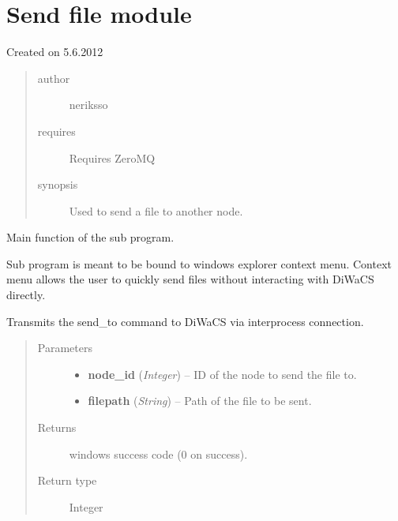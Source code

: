 \documentclass[letterpaper,10pt,english]{sphinxmanual}
\begin{document}
\section{Send file module}
\label{send_file:module-send_file_to}\label{send_file::doc}\label{send_file:send-file-module}
Created on 5.6.2012
\begin{quote}\begin{description}
\item[{author}] \leavevmode
neriksso

\item[{requires}] \leavevmode
Requires ZeroMQ

\item[{synopsis}] \leavevmode
Used to send a file to another node.

\end{description}\end{quote}

\begin{fulllineitems}
\label{send_file:send_file_to.main}
Main function of the sub program.

Sub program is meant to be bound to windows explorer context menu.
Context menu allows the user to quickly send files without interacting
with DiWaCS directly.

Transmits the send\_to command to DiWaCS via interprocess connection.
\begin{quote}\begin{description}
\item[{Parameters}] \leavevmode\begin{itemize}
\item {} 
\textbf{node\_id} (\emph{Integer}) -- ID of the node to send the file to.

\item {} 
\textbf{filepath} (\emph{String}) -- Path of the file to be sent.

\end{itemize}

\item[{Returns}] \leavevmode
windows success code (0 on success).

\item[{Return type}] \leavevmode
Integer

\end{description}\end{quote}

\end{fulllineitems}
\end{document}
